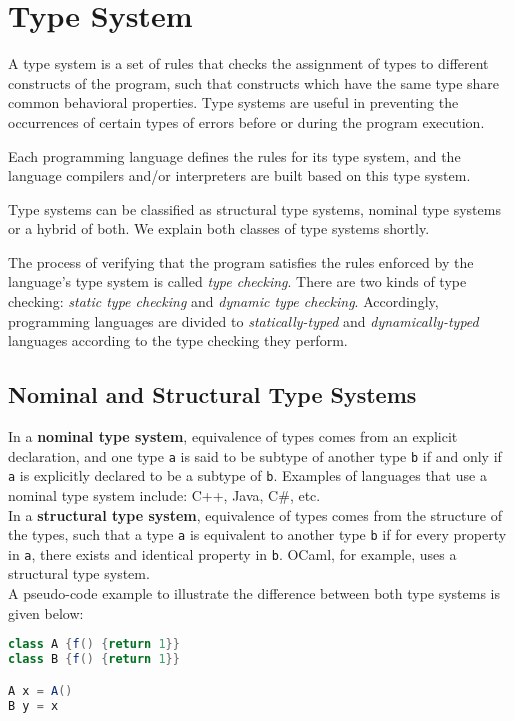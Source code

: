 \section{Type System}
A type system is a set of rules that checks the assignment of types to different constructs of the program, such that constructs which have the same type share common behavioral properties. Type systems are useful in preventing the occurrences of certain types of errors before or during the program execution.

Each programming language defines the rules for its type system, and the language compilers and/or interpreters are built based on this type system.

Type systems can be classified as structural type systems, nominal type systems or a hybrid of both. We explain both classes of type systems shortly.

The process of verifying that the program satisfies the rules enforced by the language's type system is called \textit{type checking}. There are two kinds of type checking: \textit{static type checking} and \textit{dynamic type checking}. Accordingly, programming languages are divided to \textit{statically-typed} and \textit{dynamically-typed} languages according to the type checking they perform.

\subsection{Nominal and Structural Type Systems}
In a \textbf{nominal type system}, equivalence of types comes from an explicit declaration, and one type \lstinline|a| is said to be subtype of another type \lstinline|b| if and only if \lstinline|a| is explicitly declared to be a subtype of \lstinline|b|. Examples of languages that use a nominal type system include: C++, Java, C\#, etc.\\

In a \textbf{structural type system}, equivalence of types comes from the structure of the types, such that a type \lstinline|a| is equivalent to another type \lstinline|b| if for every property in \lstinline|a|, there exists and identical property in \lstinline|b|. OCaml, for example, uses a structural type system. \\

A pseudo-code example to illustrate the difference between both type systems is given below:
\begin{lstlisting}[language=java]
class A {f() {return 1}}
class B {f() {return 1}}

A x = A()
B y = x
\end{lstlisting}

